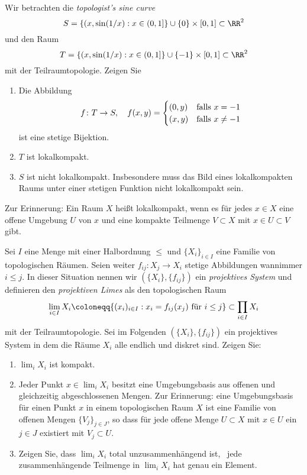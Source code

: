 

\setcounter{Sheet}{5}



\maketitle
\begin{exercise}
Wir betrachten die \emph{topologist's sine curve}
\[
S = \{(x,\sin(1/x) : x\in (0,1]\}\cup \{0\}\times[0,1] \subset \RR^2
\]
und den Raum
\[
T = \{(x,\sin(1/x) : x\in (0,1]\}\cup \{-1\}\times[0,1] \subset \RR^2
\]
mit der Teilraumtopologie. Zeigen Sie
\begin{enumerate}
\item Die Abbildung
\[
f\colon T \to S,\quad f(x,y) = \begin{cases}
(0,y) & \textnormal{falls $x=-1$} \\
(x,y) & \textnormal{falls $x\neq -1$}
\end{cases}
\]
ist eine stetige Bijektion.
\item $T$ ist lokalkompakt.
\item $S$ ist nicht lokalkompakt. {\footnotesize Insbesondere muss das Bild eines lokalkompakten Raums unter einer stetigen Funktion nicht lokalkompakt sein.}
\end{enumerate}
{\footnotesize Zur Erinnerung: Ein Raum $X$ heißt lokalkompakt, wenn es für jedes $x\in X$ eine offene Umgebung $U$ von $x$ und eine kompakte Teilmenge $V\subset X$ mit $x\in U\subset V$ gibt.}
\end{exercise}

\begin{exercise}
Sei $I$ eine Menge mit einer Halbordnung $\leq$ und $\{X_i\}_{i\in I}$ eine Familie von topologischen Räumen. Seien weiter $f_{ij}\colon X_j\to X_i$ stetige Abbildungen wannimmer $i\leq j$. In dieser Situation nennen wir $(\{X_i\}, \{f_{ij}\})$ ein \emph{projektives System} und definieren den \emph{projektiven Limes} als den topologischen Raum
\[
\lim_{i\in I} X_i \coloneqq \{(x_i)_{i\in I} : \textnormal{$x_i = f_{ij}(x_j)$ für $i\leq j$}\}\subset \prod_{i\in I} X_i
\]
mit der Teilraumtopologie. Sei im Folgenden $(\{X_i\},\{f_{ij}\})$ ein projektives System in dem die Räume $X_i$ alle endlich und diskret sind. Zeigen Sie:
\begin{enumerate}
\item $\lim_{i} X_i$ ist kompakt.
\item Jeder Punkt $x\in \lim_i X_i$ besitzt eine Umgebungsbasis aus offenen und gleichzeitig abgeschlossenen Mengen. {\footnotesize Zur Erinnerung: eine Umgebungsbasis für einen Punkt $x$ in einem topologischen Raum $X$ ist eine Familie von offenen Mengen $\{V_j\}_{j\in J}$, so dass für jede offene Menge $U\subset X$ mit $x\in U$ ein $j\in J$ existiert mit $V_j\subset U$.}
\item Zeigen Sie, dass $\lim_i X_i$ total unzusammenhängend ist, \ddh~jede zusammenhängende Teilmenge in $\lim_i X_i$ hat genau ein Element.
\end{enumerate}
\end{exercise}

